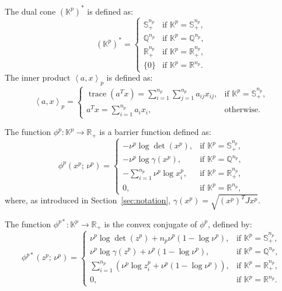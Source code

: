 \documentclass{scrartcl}
\begin{document}
The dual cone $(\mathbb{K}^p)^*$ is defined as:
\[
(\mathbb{K}^p)^* = 
\begin{cases}
    \mathbb{S}_{+}^{n_p} & \text{if } \mathbb{K}^{p} = \mathbb{S}_{+}^{n_p},\\
    \mathbb{Q}^{n_p}     & \text{if } \mathbb{K}^{p} = \mathbb{Q}^{n_p},\\
    \mathbb{R}_{+}^{n_p} & \text{if } \mathbb{K}^{p} = \mathbb{R}_{+}^{n_p},\\
    \{0\}                & \text{if } \mathbb{K}^{p} = \mathbb{R}^{n_p}.
\end{cases}
\]
The inner product $\left\langle a, x \right\rangle_p$ is defined as:
\[
\left\langle a, x \right\rangle_p = 
\begin{cases}
    \operatorname{trace}(a^T x) 
    = \sum_{i=1}^{n_p} \sum_{j=1}^{n_p} a_{ij} x_{ij}, 
    & \text{if } \mathbb{K}^p = \mathbb{S}_{+}^{n_p},\\[6pt]
    a^T x = \sum_{i=1}^{n_p} a_i x_i, 
    & \text{otherwise}.
\end{cases}
\]

The function $\phi^p : \mathbb{K}^p \to \mathbb{R}_+$ is a barrier function defined as:
\[
\phi^p(x^p;\, \nu^p) =
\begin{cases}
    -\nu^p \log \det(x^p), & \text{if } \mathbb{K}^{p} = \mathbb{S}_{+}^{n_p},\\
    -\nu^p \log \gamma(x^p), & \text{if } \mathbb{K}^{p} = \mathbb{Q}^{n_p},\\
    -\sum_{i=1}^{n_p} \nu^p \log x^p_i, & \text{if } \mathbb{K}^{p} = \mathbb{R}_{+}^{n_p},\\
    0, & \text{if } \mathbb{K}^{p} = \mathbb{R}^{n_p},
\end{cases}
\]
where, as introduced in Section~\ref{sec:notation}, $\gamma(x^p) = \sqrt{(x^p)^T J x^p}$.

The function $\phi^{p*} : \mathbb{K}^p \to \mathbb{R}_+$ is the convex conjugate of $\phi^p$, defined by:
\[
\phi^{p*}(z^p;\, \nu^p) =
\begin{cases}
    \nu^p \log \det(z^p) + n_p \nu^p (1 - \log \nu^p), 
    & \text{if } \mathbb{K}^{p} = \mathbb{S}_{+}^{n_p},\\[4pt]
    \nu^p \log \gamma(z^p) + \nu^p (1 - \log \nu^p), 
    & \text{if } \mathbb{K}^{p} = \mathbb{Q}^{n_p},\\[4pt]
    \sum_{i=1}^{n_p} \left( \nu^p \log z^p_i + \nu^p (1 - \log \nu^p) \right), 
    & \text{if } \mathbb{K}^{p} = \mathbb{R}_{+}^{n_p},\\[3pt]
    0, & \text{if } \mathbb{K}^{p} = \mathbb{R}^{n_p}.
\end{cases}
\]
\end{document}
